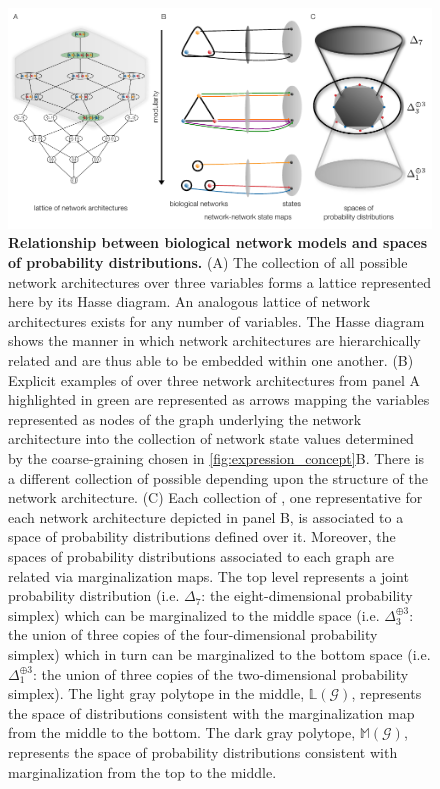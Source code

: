 


\begin{figure}[!ht]
\centering
\noindent\includegraphics[width=0.9\columnwidth]{fig/conediagram.pdf}
\caption{{\bf Relationship between biological network models and spaces of probability distributions.} (A) The collection of all possible network architectures over three variables forms a lattice represented here by its Hasse diagram. An analogous lattice of network architectures exists for any number of variables. The Hasse diagram shows the manner in which network architectures are hierarchically related and are thus able to be embedded within one another. (B) Explicit examples of \gnpm{} over three network architectures from panel A highlighted in green are represented as arrows mapping the variables represented as nodes of the graph underlying the network architecture into the collection of network state values determined by the coarse-graining chosen in \autoref{fig:expression_concept}B. There is a different collection of possible \gnpm{} depending upon the structure of the network architecture. (C) Each collection of \gnpm{}, one representative for each network architecture depicted in panel B, is associated to a space of probability distributions defined over it. Moreover, the spaces of probability distributions associated to each graph are related via marginalization maps. The top level represents a joint probability distribution (i.e. $\Delta_7$: the eight-dimensional probability simplex) which can be marginalized to the middle space (i.e. $\Delta_3^{\oplus 3}$: the union of three copies of the four-dimensional probability simplex) which in turn can be marginalized to the bottom space (i.e. $\Delta_1^{\oplus 3}$: the union of three copies of the two-dimensional probability simplex). The light gray polytope in the middle, $\mathbb{L}(\mathcal{G})$, represents the space of distributions consistent with the marginalization map from the middle to the bottom. The dark gray polytope, $\mathbb{M}(\mathcal{G})$, represents the space of probability distributions consistent with marginalization from the top to the middle.}

\end{figure}
